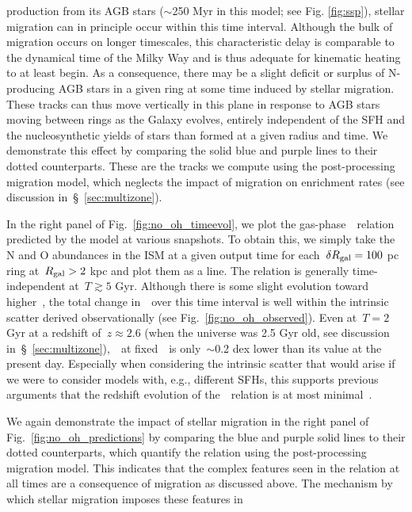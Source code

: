 \documentclass[ms.tex]{subfiles}
\begin{document}
production from its AGB stars ($\sim$250 Myr in this model; see Fig.
\ref{fig:ssp}), stellar migration can in principle occur within this time
interval.
Although the bulk of migration occurs on longer timescales, this characteristic
delay is comparable to the dynamical time of the Milky Way and is thus adequate
for kinematic heating to at least begin.
As a consequence, there may be a slight deficit or surplus of N-producing AGB
stars in a given ring at some time induced by stellar migration.
These tracks can thus move vertically in this plane in response to AGB stars
moving between rings as the Galaxy evolves, entirely independent of the SFH and
the nucleosynthetic yields of stars than formed at a given radius and time.
We demonstrate this effect by comparing the solid blue and purple lines to
their dotted counterparts.
These are the tracks we compute using the post-processing migration model,
which neglects the impact of migration on enrichment rates (see discussion
in~\S~\ref{sec:multizone}).
\par
In the right panel of Fig.~\ref{fig:no_oh_timeevol}, we plot the
gas-phase~\ohno~relation predicted by the model at various snapshots.
To obtain this, we simply take the N and O abundances in the ISM at a given
output time for each~$\delta R_\text{gal} = 100$ pc ring at~$R_\text{gal} > 2$ kpc and plot
them as a line.
The relation is generally time-independent at~$T \gtrsim 5$ Gyr.
Although there is some slight evolution toward higher~\no, the total change
in~\no~over this time interval is well within the intrinsic scatter derived
observationally (see Fig.~\ref{fig:no_oh_observed}).
Even at~$T = 2$ Gyr at a redshift of~$z \approx 2.6$ (when the universe was
2.5 Gyr old, see discussion in~\S~\ref{sec:multizone}),~\no~at
fixed~\oh~is only~$\sim$0.2 dex lower than its value at the present day.
Especially when considering the intrinsic scatter that would arise if we were
to consider models with, e.g., different SFHs, this supports previous
arguments that the redshift evolution of the~\ohno~relation is at most
minimal~\citep{Vincenzo2018, HaydenPawson2021}.
\par
We again demonstrate the impact of stellar migration in the right panel of
Fig.~\ref{fig:no_oh_predictions} by comparing the blue and purple solid lines
to their dotted counterparts, which quantify the relation using the
post-processing migration model.
This indicates that the complex features seen in the relation at all times are
a consequence of migration as discussed above.
The mechanism by which stellar migration imposes these features in
\end{document}
